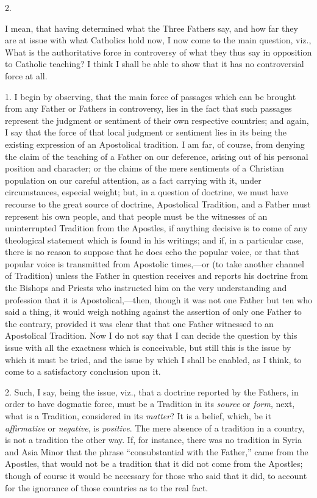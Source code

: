 2.


I mean, that having determined what the Three Fathers say, and how
far they are at issue with what Catholics hold now, I now come to the
main question, viz., What is the authoritative force in controversy of
what they thus say in opposition to Catholic teaching? I think I shall
be able to show that it has no controversial force at all.


1. I begin by observing, that the main force of passages which can be
brought from any Father or Fathers in controversy, lies in the fact that
such passages represent the judgment or sentiment of their own
respective countries; and again, I say that the force of that local
judgment or sentiment lies in its being the existing expression of an
Apostolical tradition. I am far, of course, from denying the claim of
the teaching of a Father on our deference, arising out of his personal
position and character; or the claims of the mere sentiments of a
Christian population on our careful attention, as a fact carrying with
it, under circumstances, especial weight; but, in a question of
doctrine, we must have recourse to the great source of doctrine,
Apostolical Tradition, and a Father must represent his own people,
and that people must be the witnesses of an uninterrupted Tradition from
the Apostles, if anything decisive is to come of any theological
statement which is found in his writings; and if, in a particular case,
there is no reason to suppose that he does echo the popular voice, or
that that popular voice is transmitted from Apostolic times,—or (to
take another channel of Tradition) unless the Father in question
receives and reports his doctrine from the Bishops and Priests who
instructed him on the very understanding and profession that it is
Apostolical,—then, though it was not one Father but ten who said a
thing, it would weigh nothing against the assertion of only one Father
to the contrary, provided it was clear that that one Father witnessed to
an Apostolical Tradition. Now I do not say that I can decide the
question by this issue with all the exactness which is conceivable, but
still this is the issue by which it must be tried, and the issue by
which I shall be enabled, as I think, to come to a satisfactory
conclusion upon it.


2. Such, I say, being the issue, viz., that a doctrine reported by
the Fathers, in order to have dogmatic force, must be a Tradition in its
\emph{source} or \emph{form}, next, what is a Tradition, considered in
its \emph{matter}? It is a belief, which, be it \emph{affirmative} or \emph{negative},
is \emph{positive}. The mere absence of a tradition in a country, is not
a tradition the other way. If, for instance, there was no tradition in
Syria and Asia Minor that the phrase ``consubstantial with the
Father,'' came from the Apostles, that would not be a tradition that
it did not come from the Apostles; though of course it would be
necessary for those who said that it did, to account for the
ignorance of those countries as to the real fact.


